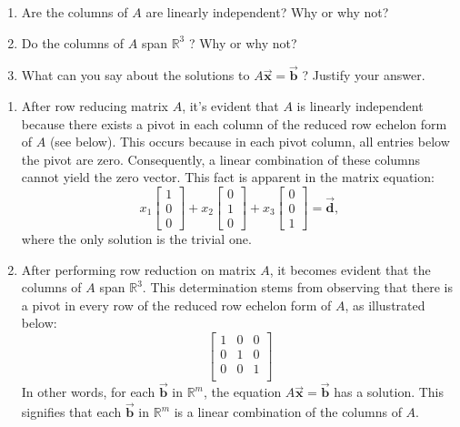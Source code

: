 \documentclass[letter,11pt]{article}
\begin{document}
\begin{enumerate}[label = \roman*.]
    \item Are the columns of $A$ are linearly independent? Why or why not?
    \item Do the columns of $A$ span $\mathbb{R}^{3}$ ? Why or why not?
    \item What can you say about the solutions to $A \vec{\boldsymbol{x}}=\vec{\boldsymbol{b}}$ ? Justify your answer.
\end{enumerate}
\begin{tcolorbox}[boxrule=1mm, width=(.9\linewidth),before=\hfill,after=\hfill,adjusted title={Problem \# 5 Solutions}]
\begin{enumerate}[label = \roman*.]
    \item After row reducing matrix $A$, it's evident that $A$ is linearly independent because there exists a pivot in each column of the reduced row echelon form of $A$ (see below). This occurs because in each pivot column, all entries below the pivot are zero. Consequently, a linear combination of these columns cannot yield the zero vector. This fact is apparent in the matrix equation: $$ x_{1} \begin{bmatrix} 1\\ 0\\ 0\end{bmatrix} + x_{2}\begin{bmatrix} 0\\ 1\\ 0\end{bmatrix} + x_{3}\begin{bmatrix} 0\\ 0\\ 1\end{bmatrix}=\vec{\boldsymbol{d}},$$ where the only solution is the trivial one.
    \item  After performing row reduction on matrix $A$, it becomes evident that the columns of $A$ span $\mathbb{R}^{3}$. This determination stems from observing that there is a pivot in every row of the reduced row echelon form of $A$, as illustrated below: $$ \begin{bmatrix} 1 & 0 & 0 \\ 0 & 1 & 0 \\ 0 & 0 & 1 \\ \end{bmatrix} $$ In other words, for each $\vec{\boldsymbol{b}}$ in $\mathbb{R}^m$, the equation $A \vec{\boldsymbol{x}} = \vec{\boldsymbol{b}}$ has a solution. This signifies that each $\vec{\boldsymbol{b}}$ in $\mathbb{R}^m$ is a linear combination of the columns of $A$.

\end{enumerate}
\end{tcolorbox}
\end{document}

